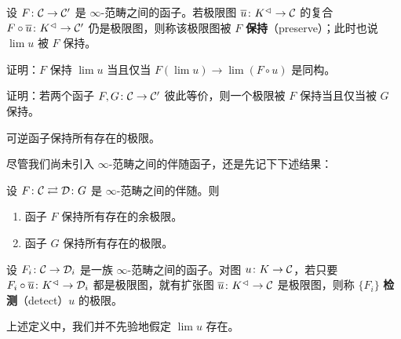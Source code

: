 \begin{definition}\label{L7-2.2}
设 $F\colon\mathcal{C}\to\mathcal{C}'$ 是 $\infty$-范畴之间的函子。若极限图 $\overline u\colon K^{\lhd}\to\mathcal{C}$ 的复合 $F\circ\overline u\colon K^{\lhd}\to\mathcal{C}'$ 仍是极限图，则称该极限图被 $F$ \textbf{保持}（preserve）；此时也说 $\lim u$ 被 $F$ 保持。
\end{definition}

\begin{exercise}\label{L7-2.3}
证明：$F$ 保持 $\lim u$ 当且仅当 $F(\lim u)\to\lim(F\circ u)$ 是同构。
\end{exercise}

\begin{exercise}\label{L7-2.4}
证明：若两个函子 $F,G\colon\mathcal{C}\to\mathcal{C}'$ 彼此等价，则一个极限被 $F$ 保持当且仅当被 $G$ 保持。
\end{exercise}

\begin{exercise}\label{L7-2.5}
可逆函子保持所有存在的极限。
\end{exercise}

\nitem\label{L7-2.6} 尽管我们尚未引入 $\infty$-范畴之间的伴随函子，还是先记下下述结果：

\begin{theorem}\label{L7-2.7}
设 $F\colon\mathcal{C}\rightleftarrows\mathcal{D}\colon G$ 是 $\infty$-范畴之间的伴随。则
\begin{enumerate}[label=(\arabic*),leftmargin=2.4em,itemsep=0.1em]
\item 函子 $F$ 保持所有存在的余极限。
\item 函子 $G$ 保持所有存在的极限。
\end{enumerate}
\end{theorem}

\begin{definition}\label{L7-2.8}
设 $F_i\colon\mathcal{C}\to\mathcal{D}_i$ 是一族 $\infty$-范畴之间的函子。对图 $u\colon K\to\mathcal{C}$，若只要 $F_i\circ\overline u\colon K^{\lhd}\to\mathcal{D}_i$ 都是极限图，就有扩张图 $\overline u\colon K^{\lhd}\to\mathcal{C}$ 是极限图，则称 $\{F_i\}$ \textbf{检测}（detect）$u$ 的极限。
\end{definition}

\begin{warning}\label{L7-2.9}
上述定义中，我们并不先验地假定 $\lim u$ 存在。
\end{warning}

